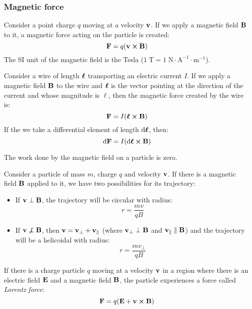 \documentclass[../../../main.tex]{subfiles}
\begin{document}
\begin{multicols}{2}
  \subsubsection{Magnetic force}
  \begin{prop}
    Consider a point charge $q$ moving at a velocity $\boldsymbol{\mathrm{v}}$. If we apply a magnetic field $\boldsymbol{\mathrm{B}}$ to it, a magnetic force acting on the particle is created: $$\vf{F}=q(\vf{v}\crossprod\vf{B})$$ The SI unit of the magnetic field is the Tesla ($1\;\text{T}=1\;\text{N}\cdot\text{A}^{-1}\cdot\text{m}^{-1}$).
  \end{prop}
  \begin{prop}
    Consider a wire of length $\boldsymbol{\mathrm{\ell}}$ transporting an electric current $I$. If we apply a magnetic field $\boldsymbol{\mathrm{B}}$ to the wire and $\boldsymbol{\mathrm{\ell}}$ is the vector pointing at the direction of the current and whose magnitude is $\ell$, then the magnetic force created by the wire is: $$\vf{F}=I(\vf{\ell}\crossprod\vf{B})$$ If the we take a differential element of length $\dd\boldsymbol{\mathrm{\ell}}$, then: $$\dd \vf{F}=I(\dd\vf{\ell}\crossprod\vf{B})$$
  \end{prop}
  \begin{lemma}
    The work done by the magnetic field on a particle is zero.
  \end{lemma}
  \begin{prop}
    Consider a particle of mass $m$, charge $q$ and velocity $\boldsymbol{\mathrm{v}}$. If there is a magnetic field $\boldsymbol{\mathrm{B}}$ applied to it, we have two possibilities for its trajectory:
    \begin{itemize}
      \item If $\boldsymbol{\mathrm{v}}\perp\boldsymbol{\mathrm{B}}$, the trajectory will be circular with radius: $$r=\frac{mv}{qB}$$
      \item If $\boldsymbol{\mathrm{v}}\not\perp\boldsymbol{\mathrm{B}}$, then $\boldsymbol{\mathrm{v}}=\boldsymbol{\mathrm{v}}_\perp+\boldsymbol{\mathrm{v}}_\parallel$ (where $\boldsymbol{\mathrm{v}}_\perp\perp\boldsymbol{\mathrm{B}}$ and $\boldsymbol{\mathrm{v}}_\parallel\parallel\boldsymbol{\mathrm{B}}$) and the trajectory will be a helicoidal with radius: $$r=\frac{mv_\perp}{qB}$$
    \end{itemize}
  \end{prop}
  \begin{prop}
    If there is a charge particle $q$ moving at a velocity $\boldsymbol{\mathrm{v}}$ in a region where there is an electric field $\boldsymbol{\mathrm{E}}$ and a magnetic field $\boldsymbol{\mathrm{B}}$, the particle experiences a force called \emph{Lorentz force}: $$\vf{F}=q(\vf{E}+\vf{v}\crossprod\vf{B})$$
  \end{prop}

\end{multicols}
\end{document}

